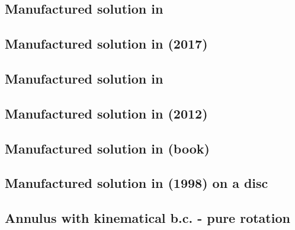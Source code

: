 \subsection{Manufactured solution in \textcite{jolm17}  \label{ss:mms_jolm17}}







\subsection{Manufactured solution in \textcite{lami17} (2017) \label{ss:mms11}}


\subsection{Manufactured solution in \textcite{muye17}} \label{ss:mms_muye17a}


\subsection{Manufactured solution in \textcite{bocg12} (2012)} \label{ss:mms_bocg12}


\subsection{Manufactured solution in \textcite{john16} (book)} \label{ss:mms_johnbook}


\subsection{Manufactured solution in \textcite{john98} (1998) on a disc} \label{ss:mms_john98}


\subsection{Annulus with kinematical b.c. - pure rotation} \label{ss:ankbc}


